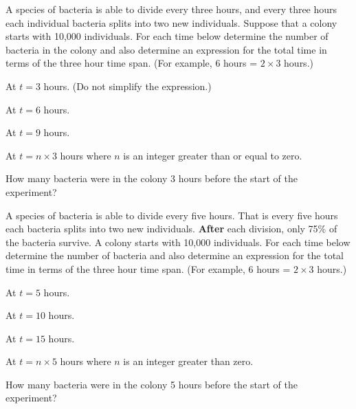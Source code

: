 \begin{problem}
\item A species of bacteria is able to divide every three hours, and
  every three hours each individual bacteria splits into two new
  individuals. Suppose that a colony starts with 10,000
  individuals. For each time below determine the number of bacteria in
  the colony and also determine an expression for the total time in
  terms of the three hour time span. (For example, 6 hours =
  $2\times 3$ hours.)
  \begin{subproblem}
  \item At $t=3$ hours. (Do not simplify the expression.)

    \vfill
    
  \item At $t=6$ hours. 
    \vfill
  \item At $t=9$ hours.
    \vfill
  \item At $t=n\times 3$ hours where $n$ is an integer greater than or
    equal to zero.  
    \vfill
  \item How many bacteria were in the colony 3 hours before the start
    of the experiment?
    \vfill
  \end{subproblem}

  \clearpage

\item A species of bacteria is able to divide every five hours. That
  is every five hours each bacteria splits into two new
  individuals. \textbf{After} each division, only 75\% of the bacteria
  survive. A colony starts with 10,000 individuals. For each time
  below determine the number of bacteria and also determine an
  expression for the total time in terms of the three hour time
  span. (For example, 6 hours = $2\times 3$ hours.)
  \begin{subproblem}
  \item At $t=5$ hours. 
    \vfill
  \item At $t=10$ hours.
    \vfill
  \item At $t=15$ hours.
    \vfill
  \item At $t=n\times 5$ hours where $n$ is an integer greater than zero.
    \vfill
  \item How many bacteria were in the colony 5 hours before the start
    of the experiment?
    \vfill
  \end{subproblem}


\end{problem}
